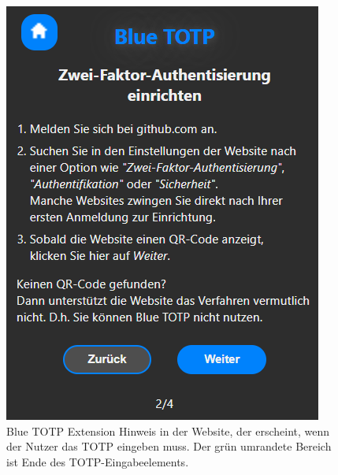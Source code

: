 \begin{figure}[H]
    \centering
    \includegraphics[width=0.5\linewidth]{figures/impl/ext_anleitung_2.png}
    \caption[Blue TOTP Extension Hinweis in Website]{Blue TOTP Extension Hinweis in der Website, der erscheint, wenn der Nutzer das TOTP eingeben muss. Der grün umrandete Bereich ist Ende des TOTP-Eingabeelements. }
    \label{fig: blue totp ext hinweis}
\end{figure}
\newpage